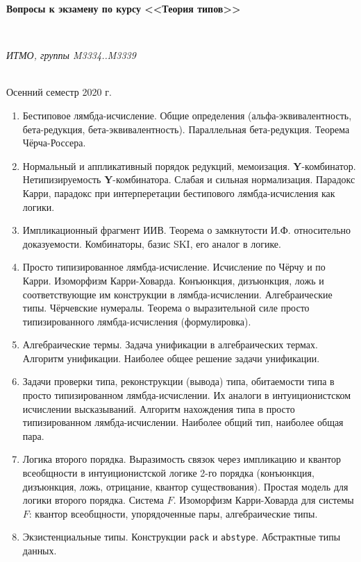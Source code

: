 \documentclass[11pt,a4paper,oneside]{article}
\begin{document}
\begin{center}
\begin{Large}{\bfseries Вопросы к экзамену по курсу <<Теория типов>>}\end{Large}\\
\vspace{1mm}
\begin{small} \itshape ИТМО, группы M3334..M3339\end{small}\\
\small Осенний семестр 2020 г.
\end{center}

\begin{enumerate}
\item Бестиповое лямбда-исчисление. Общие определения (альфа-эквивалентность, бета-редукция, бета-эквивалентность).
Параллельная бета-редукция. Теорема Чёрча-Россера.
\item Нормальный и аппликативный порядок редукций, мемоизация. \textbf{Y}-комбинатор.
Нетипизируемость \textbf{Y}-комбинатора. Слабая и сильная нормализация.
Парадокс Карри, парадокс при интерперетации бестипового лямбда-исчисления как логики.
\item Импликационный фрагмент ИИВ. Теорема о замкнутости И.Ф. относительно доказуемости.
Комбинаторы, базис SKI, его аналог в логике.
\item Просто типизированное лямбда-исчисление. Исчисление по Чёрчу и по Карри. Изоморфизм Карри-Ховарда.
Конъюнкция, дизъюнкция, ложь и соответствующие им конструкции в лямбда-исчислении. Алгебраические типы.
Чёрчевские нумералы. Теорема о выразительной силе просто типизированного лямбда-исчисления (формулировка).
\item Алгебраические термы. Задача унификации в алгебраических термах. Алгоритм унификации. Наиболее общее решение задачи унификации.
\item Задачи проверки типа, реконструкции (вывода) типа, обитаемости типа в просто типизированном лямбда-исчислении.
Их аналоги в интуиционистском исчислении высказываний. 
Алгоритм нахождения типа в просто типизированном лямбда-исчислении. Наиболее общий тип, наиболее общая пара.
\item Логика второго порядка. Выразимость связок через импликацию и квантор всеобщности в интуиционистской логике 
2-го порядка (конъюнкция, дизъюнкция, ложь, отрицание, квантор существования). Простая модель для логики второго порядка.
Система $F$. Изоморфизм Карри-Ховарда для системы $F$: квантор всеобщности, упорядоченные пары, алгебраические типы.
\item Экзистенциальные типы. Конструкции \texttt{pack} и \texttt{abstype}. Абстрактные типы данных. 

\end{enumerate}
\end{document}
